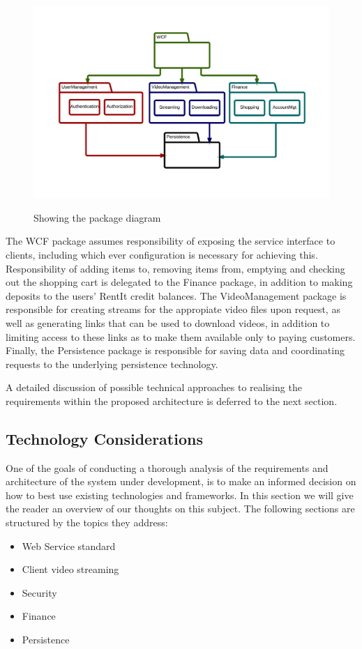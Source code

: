 \begin{figure}[H]
\centering
\includegraphics[scale=0.2]{PackageDiagram.png}
\label{packagediagram}
\caption{Showing the package diagram}
\end{figure}
The WCF package assumes responsibility of exposing the service interface to clients, including which ever configuration is necessary for achieving this. Responsibility of adding items to, removing items from, emptying and checking out the shopping cart is delegated to the Finance package, in addition to making deposits to the users' RentIt credit balances.
The VideoManagement package is responsible for creating streams for the appropiate video files upon request, as well as generating links that can be used to download videos, in addition to limiting access to these links as to make them available only to paying customers. Finally, the Persistence package is responsible for saving data and coordinating requests to the underlying persistence technology.

A detailed discussion of possible technical approaches to realising the requirements within the proposed architecture is deferred to the next section.
\subsection{Technology Considerations}
One of the goals of conducting a thorough analysis of the requirements and architecture of the system under development, is to make an informed decision on how to best use existing technologies and frameworks. In this section we will give the reader an overview of our thoughts on this subject. The following sections are structured by the topics they address:
\begin{itemize}
\item Web Service standard
\item Client video streaming
\item Security
\item Finance
\item Persistence
\end{itemize}

